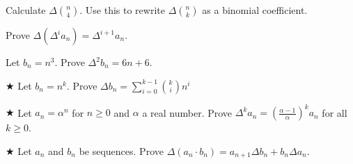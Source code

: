 \begin{exercise}
Calculate $\Delta \binom{n}{4}$.  Use this to rewrite $\Delta \binom{n}{k}$ as a binomial coefficient.
\end{exercise}


\begin{proofp}
Prove $\Delta (\Delta^i a_n)=\Delta^{i+1} a_n$.
\end{proofp}

\begin{proofp}
Let $b_n=n^3$.  Prove $\Delta^2 b_n=6n+6$.
\end{proofp}

\begin{proofp}$\bigstar$
Let $b_n=n^k$.  Prove $\Delta b_n=\sum_{i=0}^{k-1}\binom{k}{i}n^{i}$
\end{proofp}

\begin{proofp}$\bigstar$
Let $a_n=\alpha^n$ for $n \ge 0$ and $\alpha$ a real number.  Prove $\Delta^k a_n=(\frac{\alpha-1}{\alpha})^k a_n$ for all $k \ge 0$.
\end{proofp}

\begin{proofp}$\bigstar$
Let $a_n$ and $b_n$ be sequences.  Prove $\Delta (a_n\cdot b_n)=a_{n+1}\Delta b_n + b_{n}\Delta a_n$.
\end{proofp}






